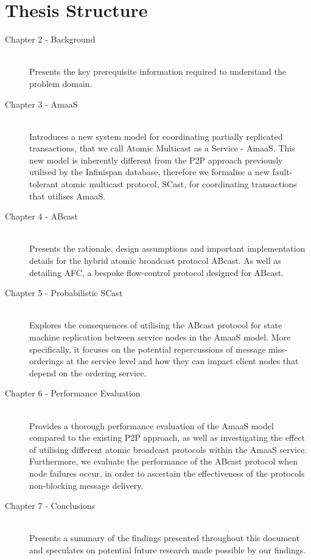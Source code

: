     \section{Thesis Structure}
         \begin{description}            
             \item[Chapter 2 - Background] \hfill \\
             Presents the key prerequisite information required to understand the problem domain.  
             
             \item[Chapter 3 - AmaaS] \hfill \\
             Introduces a new system model for coordinating partially replicated transactions, that we call Atomic Multicast as a Service - \textsf{AmaaS}.  This new model is inherently different from the P2P approach previously utilised by the Infinispan database, therefore we formalise a new fault-tolerant atomic multicast protocol, \textsf{SCast}, for coordinating transactions that utilises \textsf{AmaaS}.  
             
             \item[Chapter 4 - ABcast] \hfill \\
              Presents the rationale, design assumptions and important implementation details for the hybrid atomic broadcast protocol \textsf{ABcast}.  As well as detailing \textsf{AFC}, a bespoke flow-control protocol designed for \textsf{ABcast}.  
             
             \item[Chapter 5 - Probabilistic SCast] \hfill \\
             Explores the consequences of utilising the ABcast protocol for state machine replication between service nodes in the AmaaS model.  More specifically, it focuses on the potential repercussions of message miss-orderings at the service level and how they can impact client nodes that depend on the ordering service.  
             
             \item[Chapter 6 - Performance Evaluation] \hfill \\
             Provides a thorough performance evaluation of the \textsf{AmaaS} model compared to the existing P2P approach, as well as investigating the effect of utilising different atomic broadcast protocols within the \textsf{AmaaS} service.  Furthermore, we evaluate the performance of the \textsf{ABcast} protocol when node failures occur, in order to ascertain the effectiveness of the protocols non-blocking message delivery.  
             
             \item[Chapter 7 - Conclusions] \hfill \\
             Presents a summary of the findings presented throughout this document and speculates on potential future research made possible by our findings.  
         \end{description}